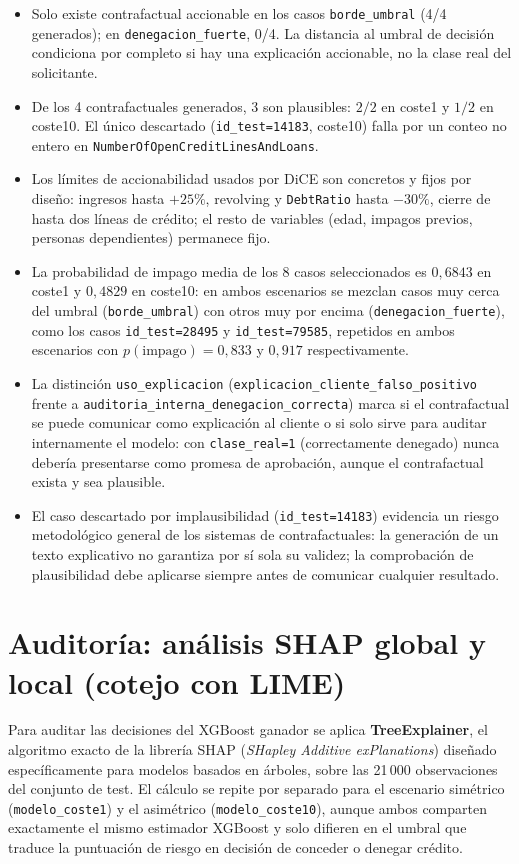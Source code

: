 \documentclass[11pt,a4paper]{article}
\begin{document}
\begin{itemize}
\item Solo existe contrafactual accionable en los casos \texttt{borde\_umbral} (4/4 generados); en \texttt{denegacion\_fuerte}, 0/4. La distancia al umbral de decisión condiciona por completo si hay una explicación accionable, no la clase real del solicitante.
\item De los 4 contrafactuales generados, 3 son plausibles: $2/2$ en coste1 y $1/2$ en coste10. El único descartado (\texttt{id\_test=14183}, coste10) falla por un conteo no entero en \texttt{NumberOfOpenCreditLinesAndLoans}.
\item Los límites de accionabilidad usados por DiCE son concretos y fijos por diseño: ingresos hasta $+25\%$, revolving y \texttt{DebtRatio} hasta $-30\%$, cierre de hasta dos líneas de crédito; el resto de variables (edad, impagos previos, personas dependientes) permanece fijo.
\item La probabilidad de impago media de los 8 casos seleccionados es $0{,}6843$ en coste1 y $0{,}4829$ en coste10: en ambos escenarios se mezclan casos muy cerca del umbral (\texttt{borde\_umbral}) con otros muy por encima (\texttt{denegacion\_fuerte}), como los casos \texttt{id\_test=28495} y \texttt{id\_test=79585}, repetidos en ambos escenarios con $p(\text{impago})=0{,}833$ y $0{,}917$ respectivamente.
\item La distinción \texttt{uso\_explicacion} (\texttt{explicacion\_cliente\_falso\_positivo} frente a \texttt{auditoria\_interna\_denegacion\_correcta}) marca si el contrafactual se puede comunicar como explicación al cliente o si solo sirve para auditar internamente el modelo: con \texttt{clase\_real=1} (correctamente denegado) nunca debería presentarse como promesa de aprobación, aunque el contrafactual exista y sea plausible.
\item El caso descartado por implausibilidad (\texttt{id\_test=14183}) evidencia un riesgo metodológico general de los sistemas de contrafactuales: la generación de un texto explicativo no garantiza por sí sola su validez; la comprobación de plausibilidad debe aplicarse siempre antes de comunicar cualquier resultado.
\end{itemize}

\section{Auditoría: análisis SHAP global y local (cotejo con LIME)}

Para auditar las decisiones del XGBoost ganador se aplica \textbf{TreeExplainer}, el algoritmo exacto de la librería SHAP (\emph{SHapley Additive exPlanations}) diseñado específicamente para modelos basados en árboles, sobre las 21\,000 observaciones del conjunto de test. El cálculo se repite por separado para el escenario simétrico (\texttt{modelo\_coste1}) y el asimétrico (\texttt{modelo\_coste10}), aunque ambos comparten exactamente el mismo estimador XGBoost y solo difieren en el umbral que traduce la puntuación de riesgo en decisión de conceder o denegar crédito.
\end{document}
